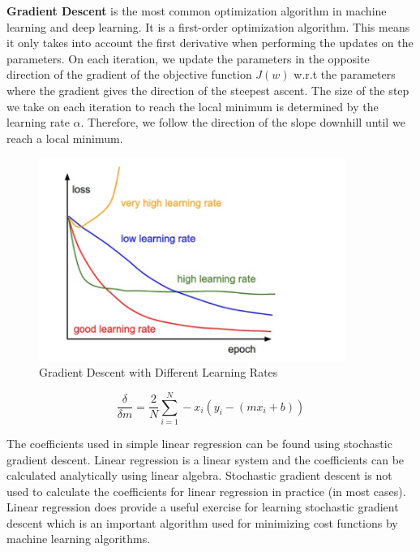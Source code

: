 \textbf{Gradient Descent} is the most common optimization algorithm in machine learning and deep learning. It is a first-order optimization algorithm. This means it only takes into account the first derivative when performing the updates on the parameters. On each iteration, we update the parameters in the opposite direction of the gradient of the objective function $J(w)$ w.r.t the parameters where the gradient gives the direction of the steepest ascent. The size of the step we take on each iteration to reach the local minimum is determined by the learning rate $α$. Therefore, we follow the direction of the slope downhill until we reach a local minimum.

\begin{figure}[H]
    \centering
    \includegraphics[width=10cm]{images/gradient-descent-different-learning-rates.png}
    \caption{Gradient Descent with Different Learning Rates}
\end{figure}

\pagebreak

\[
    \frac{\delta}{\delta m} = \frac{2}{N} \sum_{i=1}^{N} - x_{i}(y_{i} - (mx_{i} +b))
\]

The coefficients used in simple linear regression can be found using stochastic gradient descent. Linear regression is a linear system and the coefficients can be calculated analytically using linear algebra. Stochastic gradient descent is not used to calculate the coefficients for linear regression in practice (in most cases). Linear regression does provide a useful exercise for learning stochastic gradient descent which is an important algorithm used for minimizing cost functions by machine learning algorithms.

